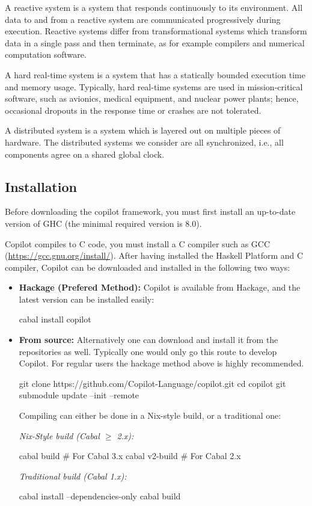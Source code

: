 A reactive system is a system that responds continuously to its environment.
%
All data to and from a reactive system are communicated progressively during
execution.
%
 Reactive systems differ from transformational systems which transform data in
a single pass and then terminate, as for example compilers and numerical
computation software.
%

A hard real-time system is a system that has a statically bounded execution
time and memory usage.
%
 Typically, hard real-time systems are used in mission-critical software, such
as avionics, medical equipment, and nuclear power plants; hence, occasional
dropouts in the response time or crashes are not tolerated.

A distributed system is a system which is layered out on multiple pieces of
hardware.
%
The distributed systems we consider are all synchronized, i.e., all components
agree on a shared global clock.


\subsection{Installation} \label{sec:install}

Before downloading the copilot framework, you must first install an
up-to-date version of GHC (the minimal required version is 8.0).
%

\noindent Copilot compiles to C code, you must install a C compiler such as GCC (\url{https://gcc.gnu.org/install/}). After having installed the Haskell Platform and C compiler, Copilot can be downloaded and
installed in the following two ways:

\begin{itemize}
\item \textbf{Hackage (Prefered Method): } Copilot is available from Hackage,
and the latest version can be installed easily:
\begin{code}
cabal install copilot
\end{code}

\item \textbf{From source: } Alternatively one can download and install it from
the repositories as well. Typically one would only go this route to develop
Copilot. For regular users the hackage method above is highly recommended.
\begin{code}
git clone https://github.com/Copilot-Language/copilot.git
cd copilot
git submodule update --init --remote
\end{code}
Compiling can either be done in a Nix-style build, or a traditional one:

\noindent\emph{Nix-Style build (Cabal $\ge$ 2.x):}
\begin{code}
cabal build       # For Cabal 3.x
cabal v2-build    # For Cabal 2.x
\end{code}

\noindent\emph{Traditional build (Cabal 1.x):}
\begin{code}
cabal install --dependencies-only
cabal build
\end{code}
\end{itemize}


